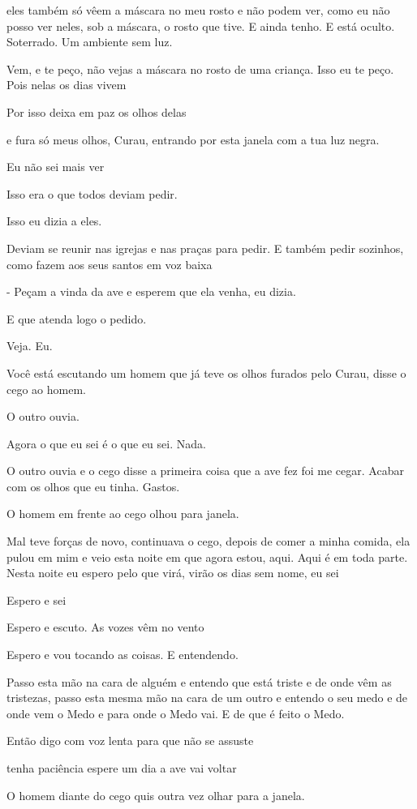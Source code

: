 eles também só vêem a máscara no meu rosto e não podem ver, como eu não
posso ver neles, sob a máscara, o rosto que tive. E ainda tenho. E está
oculto. Soterrado. Um ambiente sem luz.

Vem, e te peço, não vejas a máscara no rosto de uma criança. Isso eu te
peço. Pois nelas os dias vivem

Por isso deixa em paz os olhos delas

e fura só meus olhos, Curau, entrando por esta janela com a tua luz
negra.

Eu não sei mais ver

Isso era o que todos deviam pedir.

Isso eu dizia a eles.

Deviam se reunir nas igrejas e nas praças para pedir. E também pedir
sozinhos, como fazem aos seus santos em voz baixa

- Peçam a vinda da ave e esperem que ela venha, eu dizia.

E que atenda logo o pedido.

Veja. Eu.

Você está escutando um homem que já teve os olhos furados pelo Curau,
disse o cego ao homem.

O outro ouvia.

Agora o que eu sei é o que eu sei. Nada.

O outro ouvia e o cego disse a primeira coisa que a ave fez foi me
cegar. Acabar com os olhos que eu tinha. Gastos.

O homem em frente ao cego olhou para janela.

Mal teve forças de novo, continuava o cego, depois de comer a minha
comida, ela pulou em mim e veio esta noite em que agora estou, aqui.
Aqui é em toda parte. Nesta noite eu espero pelo que virá, virão os dias
sem nome, eu sei

Espero e sei

Espero e escuto. As vozes vêm no vento

Espero e vou tocando as coisas. E entendendo.

Passo esta mão na cara de alguém e entendo que está triste e de onde vêm
as tristezas, passo esta mesma mão na cara de um outro e entendo o seu
medo e de onde vem o Medo e para onde o Medo vai. E de que é feito o
Medo.

Então digo com voz lenta para que não se assuste

tenha paciência espere um dia a ave vai voltar

O homem diante do cego quis outra vez olhar para a janela.

